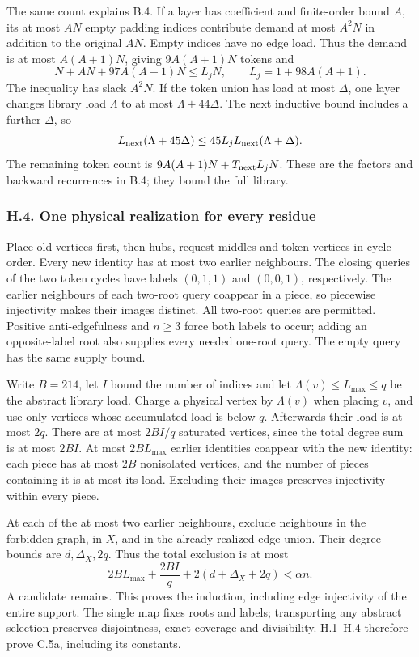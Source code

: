 \documentclass[english,11pt,a4paper]{article}
\begin{document}
The same count explains B.4. If a layer has coefficient and finite-order bound \(A\), its at most \(AN\) empty padding indices contribute demand at most \(A^2N\) in addition to the original \(AN\). Empty indices have no edge load. Thus the demand is at most \(A(A+1)N\), giving \(9A(A+1)N\) tokens and \[N+AN+97A(A+1)N\le L_jN,\qquad L_j=1+98A(A+1).\] The inequality has slack \(A^2N\). If the token union has load at most \(\Delta\), one layer changes library load \(\Lambda\) to at most \(\Lambda+44\Delta\). The next inductive bound includes a further \(\Delta\), so \[L_{\rm next}(\Lambda+45\Delta)
\le45L_jL_{\rm next}(\Lambda+\Delta).\] The remaining token count is \(9A(A+1)N+T_{\rm next}L_jN\). These are the factors and backward recurrences in B.4; they bound the full library.

\subsubsection{H.4. One physical realization for every residue}\label{h.4.-one-physical-realization-for-every-residue}

Place old vertices first, then hubs, request middles and token vertices in cycle order. Every new identity has at most two earlier neighbours. The closing queries of the two token cycles have labels \((0,1,1)\) and \((0,0,1)\), respectively. The earlier neighbours of each two-root query coappear in a piece, so piecewise injectivity makes their images distinct. All two-root queries are permitted. Positive anti-edgefulness and \(n\ge3\) force both labels to occur; adding an opposite-label root also supplies every needed one-root query. The empty query has the same supply bound.

Write \(B=214\), let \(I\) bound the number of indices and let \(\Lambda(v)\le L_{\max}\le q\) be the abstract library load. Charge a physical vertex by \(\Lambda(v)\) when placing \(v\), and use only vertices whose accumulated load is below \(q\). Afterwards their load is at most \(2q\). There are at most \(2BI/q\) saturated vertices, since the total degree sum is at most \(2BI\). At most \(2BL_{\max}\) earlier identities coappear with the new identity: each piece has at most \(2B\) nonisolated vertices, and the number of pieces containing it is at most its load. Excluding their images preserves injectivity within every piece.

At each of the at most two earlier neighbours, exclude neighbours in the forbidden graph, in \(X\), and in the already realized edge union. Their degree bounds are \(d,\Delta_X,2q\). Thus the total exclusion is at most \[2BL_{\max}+\frac{2BI}{q}+2(d+\Delta_X+2q)<\alpha n.\] A candidate remains. This proves the induction, including edge injectivity of the entire support. The single map fixes roots and labels; transporting any abstract selection preserves disjointness, exact coverage and divisibility. H.1--H.4 therefore prove C.5a, including its constants.
\end{document}
